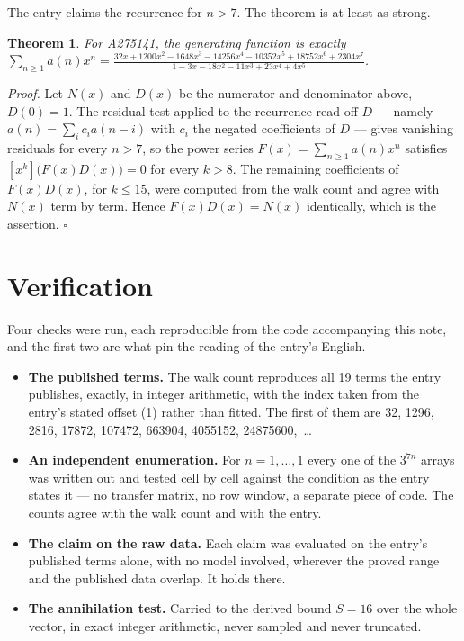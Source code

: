 \documentclass[11pt]{article}
\newtheorem{theorem}{Theorem}
\theoremstyle{definition}
\begin{document}
The entry claims the recurrence for $n > 7$. The theorem is at least as strong.

\begin{theorem} For A275141, the generating function is exactly $\sum_{n\ge 1} a(n)x^n = \frac{32x + 1200x^{2} - 1648x^{3} - 14256x^{4} - 10352x^{5} + 18752x^{6} + 2304x^{7}}{1 - 3x - 18x^{2} - 11x^{3} + 23x^{4} + 4x^{5}}$.\end{theorem}

{\itshape Proof.} Let $N(x)$ and $D(x)$ be the numerator and denominator above, $D(0)=1$. The residual test applied to the recurrence read off $D$ --- namely $a(n) = \sum_i c_i a(n-i)$ with $c_i$ the negated coefficients of $D$ --- gives vanishing residuals for every $n > 7$, so the power series $F(x)=\sum_{n\ge 1}a(n)x^n$ satisfies $[x^k]\bigl(F(x)D(x)\bigr) = 0$ for every $k > 8$. The remaining coefficients of $F(x)D(x)$, for $k \le 15$, were computed from the walk count and agree with $N(x)$ term by term. Hence $F(x)D(x) = N(x)$ identically, which is the assertion. $\square$

\section{Verification}

Four checks were run, each reproducible from the code accompanying this note, and the first two are what pin the reading of the entry's English.

\begin{itemize}

\item {\bfseries The published terms.} The walk count reproduces all 19 terms the entry publishes, exactly, in integer arithmetic, with the index taken from the entry's stated offset (1) rather than fitted. The first of them are 32, 1296, 2816, 17872, 107472, 663904, 4055152, 24875600,~\dots

\item {\bfseries An independent enumeration.} For $n = 1,\dots,1$ every one of the $3^{7n}$ arrays was written out and tested cell by cell against the condition as the entry states it --- no transfer matrix, no row window, a separate piece of code. The counts agree with the walk count and with the entry.

\item {\bfseries The claim on the raw data.} Each claim was evaluated on the entry's published terms alone, with no model involved, wherever the proved range and the published data overlap. It holds there.

\item {\bfseries The annihilation test.} Carried to the derived bound $S = 16$ over the whole vector, in exact integer arithmetic, never sampled and never truncated.

\end{itemize}
\end{document}
